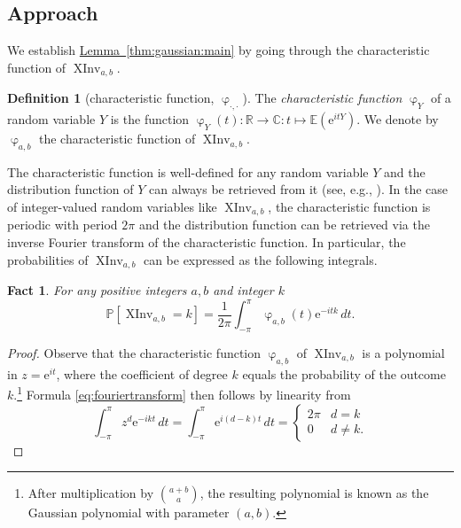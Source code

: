 \documentclass[11pt]{article}
\numberwithin{equation}{section}
\newtheorem{fact}[theorem]{Fact}
\theoremstyle{definition}
\newtheorem{definition}[theorem]{Definition}
\theoremstyle{plain}
\newcommand{\eee}{\mathrm e}
\newcommand{\expref}[2]{\hyperref[#2]{#1~\ref{#2}}}
\renewcommand{\Pr}{\mathbb{P}}
\newcommand{\Expect}{\mathbb{E}}
\newcommand{\XInvD}{\XInv}
\DeclareMathOperator{\charfn}{\varphi}
\DeclareMathOperator{\XInv}{XInv}
\begin{document}
\subsection{Approach}

We establish \expref{Lemma}{thm:gaussian:main} by going through the characteristic function of $\XInvD_{a,b}$. 
\begin{definition}[characteristic function, $\charfn_{\cdot,\cdot}$]
The \emph{characteristic function} $\charfn_Y$ of a random variable $Y$ is the function $\charfn_Y(t):\mathbb{R}\to\mathbb{C}: t \mapsto \Expect(\eee^{itY})$. We denote by $\charfn_{a,b}$ the characteristic function of $\XInv_{a,b}$.
\end{definition}
The characteristic function is well-defined for any random variable $Y$ and the distribution function of $Y$ can always be retrieved from it (see, e.g., \cite[Chapter VI]{Renyi}). In the case of integer-valued random variables like $\XInvD_{a,b}$, the characteristic function is periodic with period $2\pi$ and the distribution function can be retrieved via the inverse Fourier transform of the characteristic function. In particular, the probabilities of $\XInvD_{a,b}$ can be expressed as the following integrals.
\begin{fact}
For any positive integers $a,b$ and integer $k$
\begin{equation}
    \label{eq:fouriertransform}
    \Pr[\XInvD_{a,b}=k] = \frac{1}{2\pi} \int_{-\pi}^{\pi}\charfn_{a,b}(t)\eee^{-itk}\,dt.
\end{equation}
\end{fact}
\begin{proof}
Observe that the characteristic function $\charfn_{a,b}$ of $\XInv_{a,b}$ is a polynomial in $z=\eee^{it}$, where the coefficient of degree $k$ equals the probability of the outcome $k$.\footnote{After multiplication by $\binom{a+b}{a}$, the resulting polynomial is known as the Gaussian polynomial with parameter $(a,b)$.} 
Formula \eqref{eq:fouriertransform} then follows by linearity from
\[
\int_{-\pi}^\pi z^d \eee^{-ikt} \, dt = 
\int_{-\pi}^\pi \eee^{i(d-k)t} \, dt =
\left\{ \begin{array}{cl} 2\pi & d=k \\
                             0 & d \ne k.
\end{array} \right.
\]
\end{proof}
\end{document}
